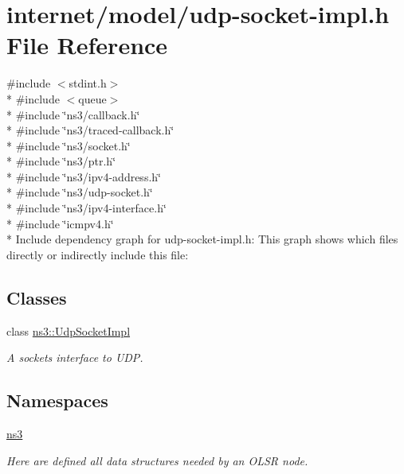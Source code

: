 \hypertarget{udp-socket-impl_8h}{}\section{internet/model/udp-\/socket-\/impl.h File Reference}
\label{udp-socket-impl_8h}
{\ttfamily \#include $<$stdint.\+h$>$}\\*
{\ttfamily \#include $<$queue$>$}\\*
{\ttfamily \#include \char`\"{}ns3/callback.\+h\char`\"{}}\\*
{\ttfamily \#include \char`\"{}ns3/traced-\/callback.\+h\char`\"{}}\\*
{\ttfamily \#include \char`\"{}ns3/socket.\+h\char`\"{}}\\*
{\ttfamily \#include \char`\"{}ns3/ptr.\+h\char`\"{}}\\*
{\ttfamily \#include \char`\"{}ns3/ipv4-\/address.\+h\char`\"{}}\\*
{\ttfamily \#include \char`\"{}ns3/udp-\/socket.\+h\char`\"{}}\\*
{\ttfamily \#include \char`\"{}ns3/ipv4-\/interface.\+h\char`\"{}}\\*
{\ttfamily \#include \char`\"{}icmpv4.\+h\char`\"{}}\\*
Include dependency graph for udp-\/socket-\/impl.h\+:
This graph shows which files directly or indirectly include this file\+:
\subsection*{Classes}
\begin{DoxyCompactItemize}
\item 
class \hyperlink{classns3_1_1UdpSocketImpl}{ns3\+::\+Udp\+Socket\+Impl}
\begin{DoxyCompactList}\small\item\em A sockets interface to U\+DP. \end{DoxyCompactList}\end{DoxyCompactItemize}
\subsection*{Namespaces}
\begin{DoxyCompactItemize}
\item 
 \hyperlink{namespacens3}{ns3}
\begin{DoxyCompactList}\small\item\em Here are defined all data structures needed by an O\+L\+SR node. \end{DoxyCompactList}\end{DoxyCompactItemize}
